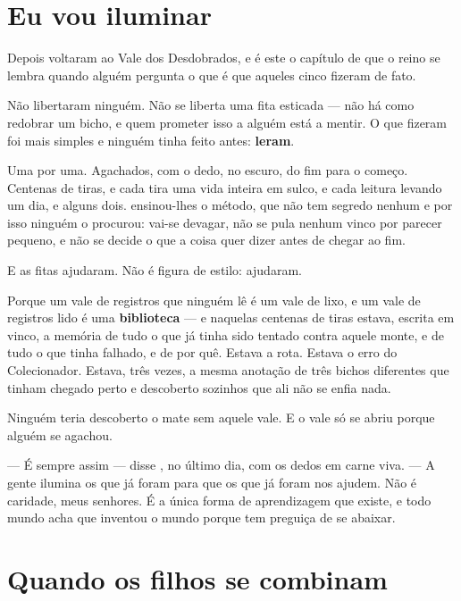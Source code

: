 \documentclass[livro.tex]{subfiles}
\begin{document}
\section{Eu vou iluminar}

Depois voltaram ao Vale dos Desdobrados, e é este o capítulo de que o reino se lembra quando
alguém pergunta o que é que aqueles cinco fizeram de fato.

Não libertaram ninguém. Não se liberta uma fita esticada --- não há como redobrar um bicho, e
quem prometer isso a alguém está a mentir. O que fizeram foi mais simples e ninguém tinha feito
antes: \textbf{leram}.

Uma por uma. Agachados, com o dedo, no escuro, do fim para o começo. Centenas de tiras, e cada
tira uma vida inteira em sulco, e cada leitura levando um dia, e alguns dois. \Qui ensinou-lhes o
método, que não tem segredo nenhum e por isso ninguém o procurou: vai-se devagar, não se pula
nenhum vinco por parecer pequeno, e não se decide o que a coisa quer dizer antes de chegar ao
fim.

\medskip

E as fitas ajudaram. Não é figura de estilo: ajudaram.

Porque um vale de registros que ninguém lê é um vale de lixo, e um vale de registros lido é uma
\textbf{biblioteca} --- e naquelas centenas de tiras estava, escrita em vinco, a memória de tudo
o que já tinha sido tentado contra aquele monte, e de tudo o que tinha falhado, e de por quê.
Estava a rota. Estava o erro do Colecionador. Estava, três vezes, a mesma anotação de três bichos
diferentes que tinham chegado perto e descoberto sozinhos que ali não se enfia nada.

Ninguém teria descoberto o mate sem aquele vale. E o vale só se abriu porque alguém se agachou.

\medskip

--- É sempre assim --- disse \Qui , no último dia, com os dedos em carne viva. --- A gente
ilumina os que já foram para que os que já foram nos ajudem. Não é caridade, meus senhores. É a
única forma de aprendizagem que existe, e todo mundo acha que inventou o mundo porque tem
preguiça de se abaixar.

\section{Quando os filhos se combinam}
\end{document}
